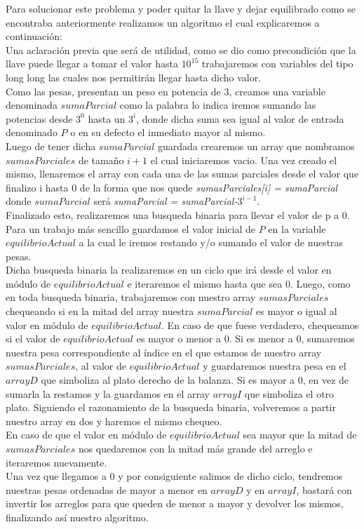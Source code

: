 
Para solucionar este problema y poder quitar la llave y dejar equilibrado como se encontraba anteriormente realizamos un algoritmo el cual explicaremos a continuaci\'on:\\

Una aclaraci\'on previa que ser\'a de utilidad, como se dio como precondici\'on que la llave puede llegar a tomar el valor hasta $10^{15}$ trabajaremos con variables del tipo long long las cuales nos permitir\'an llegar hasta dicho valor.\\

Como las pesas, presentan un peso en potencia de 3, creamos una variable denominada $sumaParcial$ como la palabra lo indica iremos sumando las potencias desde $3^0$ hasta un $3^i$, donde dicha suma sea igual al valor de entrada denominado $P$ o en su defecto el inmediato mayor al mismo.\\

Luego de tener dicha $sumaParcial$ guardada crearemos un array que nombramos $sumasParciales$ de tamaño $i+1$ el cual iniciaremos vacio. Una vez creado el mismo, llenaremos el array con cada una de las sumas parciales desde el valor que finalizo i hasta 0 de la forma que nos quede \textit{sumasParciales[i] = sumaParcial} donde $sumaParcial$ ser\'a \textit{sumaParcial = sumaParcial-$3^{i-1}$}.\\

Finalizado esto, realizaremos una busqueda binaria para llevar el valor de p a 0. Para un trabajo m\'as sencillo guardamos el valor inicial de $P$ en la variable $equilibrioActual$ a la cual le iremos restando y/o sumando el valor de nuestras pesas.\\

Dicha busqueda binaria la realizaremos en un ciclo que ir\'a desde el valor en m\'odulo de $equilibrioActual$ e iteraremos el mismo hasta que sea 0. Luego, como en toda busqueda binaria, trabajaremos con nuestro array $sumasParciales$ chequeando si en la mitad del array nuestra $sumaParcial$ es mayor o igual al valor en m\'odulo de $equilibrioActual$. En caso de que fuese verdadero, chequeamos si el valor de $equilibrioActual$ es mayor o menor a 0. Si es menor a 0, sumaremos nuestra pesa correspondiente al \'indice en el que estamos de nuestro array $sumasParciales$, al valor de $equilibrioActual$ y guardaremos nuestra pesa en el $arrayD$ que simboliza al plato derecho de la balanza. Si es mayor a 0, en vez de sumarla la restamos y la guardamos en el array $arrayI$ que simboliza el otro plato. Siguiendo el razonamiento de la busqueda binaria, volveremos a partir nuestro array en dos y haremos el mismo chequeo.\\

En caso de que el valor en m\'odulo de $equilibrioActual$ sea mayor que la mitad de $sumasParciales$ nos quedaremos con la mitad m\'as grande del arreglo e iteraremos nuevamente.\\

Una vez que llegamos a 0 y por consiguiente salimos de dicho ciclo, tendremos nuestras pesas ordenadas de mayor a menor en $arrayD$ y en $arrayI$, bastar\'a con invertir los arreglos para que queden de menor a mayor y devolver los mismos, finalizando as\'i nuestro algoritmo.\\

